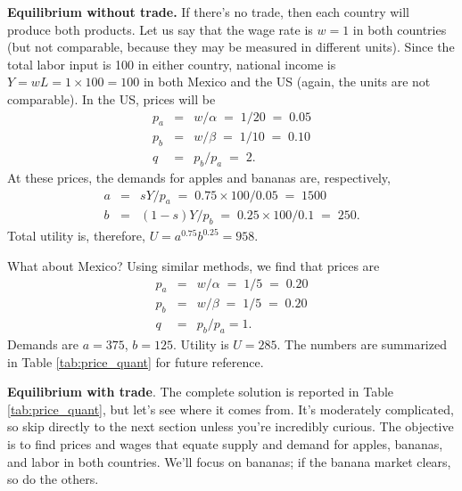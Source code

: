 \textbf{Equilibrium without trade.} If there's no trade, then each
country will produce both products.  Let us say that the wage rate
is $w = 1$ in both countries (but not comparable, because they may
be measured in different units).  Since the total labor input
is 100 in either country, national income is $Y = wL = 1\times 100
= 100$ in both Mexico and the US (again, the units are not comparable).
In the US, prices will be
\begin{eqnarray*}
    p_{a} &=& w/\alpha \;=\; {1}/{20} \;=\; 0.05\\
    p_{b} &=& {w}/{\beta} \;=\; {1}/{10} \;=\; 0.10\\
    q &=& {p_{b}}/{p_{a}} \;=\; 2.
\end{eqnarray*}
At these prices, the demands for apples and bananas are, respectively,
\begin{eqnarray*}
    a &=& {sY}/{p_{a}} \;=\; {0.75\times 100}/{0.05} \;=\; 1500\\
    b &=& {(1-s)Y}/{p_{b}} \;=\; {0.25\times 100}/{0.1} \;=\; 250 .
\end{eqnarray*}
Total utility is, therefore, $U = a^{0.75}b^{0.25} = 958$.

What about Mexico? Using similar methods, we find that prices are
%
\begin{eqnarray*}
    p_{a} &=&  {w}/{\alpha} \;=\; {1}/{5} \;=\; 0.20 \\
    p_{b} &=&  {w}/{\beta} \;=\; {1}/{5} \;=\; 0.20 \\
    q &=& {p_{b}}/{p_{a}} = 1.
\end{eqnarray*}
Demands are $a = 375$, $b = 125$. Utility is $U = 285$.  The
numbers are summarized in Table \ref{tab:price_quant} for future
reference.


\textbf{Equilibrium with trade}.
The complete solution is reported in Table \ref{tab:price_quant},
but let's see where it comes from.
It's moderately complicated,
so skip directly to the next section unless you're
incredibly curious.
The objective is to find prices and wages that equate
supply and demand for apples, bananas, and labor in both countries.
We'll focus on bananas; if the banana market clears,
so do the others.



